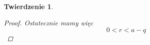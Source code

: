 \documentclass[12pt]{article}
\newtheorem*{theorem*}{Twierdzenie}
\begin{document}
\begin{titlepage}
\begin{theorem*}
\begin{proof}
Ostatecznie mamy więc
$$0 < r < a - q$$
\end{proof}

\end{theorem*}


\end{titlepage}
\end{document}
